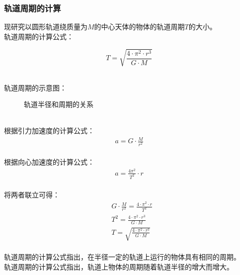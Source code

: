 \documentclass[UTF8]{ctexart}
\begin{document}
\newpage

\subsubsection{轨道周期的计算}
    \setcounter{equation}{0}
    现研究以圆形轨道绕质量为$M$的中心天体的物体的轨道周期$T$的大小。\\[3mm]
    轨道周期的计算公式：
    \begin{large}
        \begin{equation*}
            T=\sqrt{\frac{4\cdot \pi^2\cdot r^3}{G\cdot M}}
        \end{equation*}
    \end{large}\\
    轨道周期的示意图：
    \begin{figure}[h]
        \begin{center}
            \caption{轨道半径和周期的关系}
        \end{center}
    \end{figure}\\
    根据引力加速度的计算公式：
    \begin{align}
        a=G\cdot\frac{M}{r^2}
    \end{align}\\
    根据向心加速度的计算公式：
    \begin{align}
        a=\frac{4\pi^2}{T^2}\cdot r
    \end{align}\\
    将两者联立可得：
    \begin{align}
        &G\cdot\frac{M}{r^2}=\frac{4\cdot \pi^2\cdot r}{T^2}\\[3mm]
        &T^2=\frac{4\cdot\pi^2\cdot r^3}{G\cdot M}\\[3mm]
        &T=\sqrt{\frac{4\cdot\pi^2\cdot r^3}{G\cdot M}}
    \end{align}\\
    轨道周期的计算公式指出，在半径一定的轨道上运行的物体具有相同的周期。\\[3mm]
    轨道周期的计算公式指出，轨道上物体的周期随着轨道半径的增大而增大。
\end{document}
